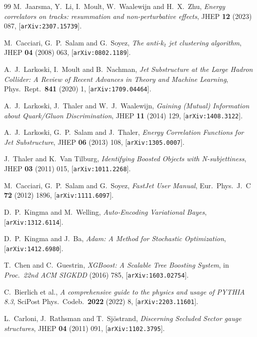 \documentclass[a4paper,11pt]{article}
\begin{document}
\begin{thebibliography}{99}
M.~Jaarsma, Y.~Li, I.~Moult, W.~Waalewijn and H.~X.~Zhu,
\emph{Energy correlators on tracks: resummation and non-perturbative
effects},
JHEP \textbf{12} (2023) 087, [\texttt{arXiv:2307.15739}].

M.~Cacciari, G.~P.~Salam and G.~Soyez,
\emph{The anti-$k_t$ jet clustering algorithm},
JHEP \textbf{04} (2008) 063, [\texttt{arXiv:0802.1189}].

A.~J.~Larkoski, I.~Moult and B.~Nachman,
\emph{Jet Substructure at the Large Hadron Collider: A Review of Recent
Advances in Theory and Machine Learning},
Phys.\ Rept.\ \textbf{841} (2020) 1, [\texttt{arXiv:1709.04464}].

A.~J.~Larkoski, J.~Thaler and W.~J.~Waalewijn,
\emph{Gaining (Mutual) Information about Quark/Gluon Discrimination},
JHEP \textbf{11} (2014) 129, [\texttt{arXiv:1408.3122}].

A.~J.~Larkoski, G.~P.~Salam and J.~Thaler,
\emph{Energy Correlation Functions for Jet Substructure},
JHEP \textbf{06} (2013) 108, [\texttt{arXiv:1305.0007}].

J.~Thaler and K.~Van Tilburg,
\emph{Identifying Boosted Objects with N-subjettiness},
JHEP \textbf{03} (2011) 015, [\texttt{arXiv:1011.2268}].

M.~Cacciari, G.~P.~Salam and G.~Soyez,
\emph{FastJet User Manual},
Eur.\ Phys.\ J.\ C \textbf{72} (2012) 1896, [\texttt{arXiv:1111.6097}].

D.~P.~Kingma and M.~Welling,
\emph{Auto-Encoding Variational Bayes},
[\texttt{arXiv:1312.6114}].

D.~P.~Kingma and J.~Ba,
\emph{Adam: A Method for Stochastic Optimization},
[\texttt{arXiv:1412.6980}].

T.~Chen and C.~Guestrin,
\emph{XGBoost: A Scalable Tree Boosting System},
in \emph{Proc.\ 22nd ACM SIGKDD} (2016) 785,
[\texttt{arXiv:1603.02754}].

C.~Bierlich et al.,
\emph{A comprehensive guide to the physics and usage of PYTHIA 8.3},
SciPost Phys.\ Codeb.\ \textbf{2022} (2022) 8,
[\texttt{arXiv:2203.11601}].

L.~Carloni, J.~Rathsman and T.~Sj\"ostrand,
\emph{Discerning Secluded Sector gauge structures},
JHEP \textbf{04} (2011) 091, [\texttt{arXiv:1102.3795}].

\end{thebibliography}
\end{document}
